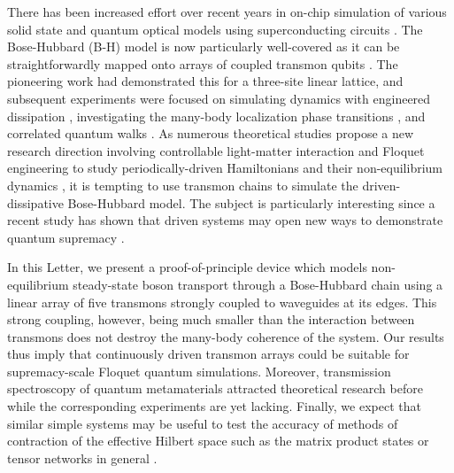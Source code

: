 \documentclass[%
 aps, prl,
 amsmath,amssymb,
 reprint,%
superscriptaddress
]{revtex4-2}
\begin{document}
\maketitle



There has been increased effort over recent years in on-chip simulation of various solid state and quantum optical models using superconducting circuits \cite{kjaergaard2019superconducting}. The Bose-Hubbard (B-H) model is now particularly well-covered as it can be straightforwardly mapped onto arrays of coupled transmon qubits \cite{orell2019probing,yanay2020two}. The pioneering work \cite{hacohen2015cooling} had demonstrated this for a three-site linear lattice, and subsequent experiments were focused on simulating dynamics with engineered dissipation \cite{ma2019dissipatively}, investigating the many-body localization phase transitions \cite{roushan2017spectroscopic,chiaro2019growth}, and correlated quantum walks \cite{Yan2019, Ye2019}. As numerous theoretical studies propose a new research direction involving controllable light-matter interaction and Floquet engineering to study periodically-driven Hamiltonians and their non-equilibrium dynamics \cite{Goldman2014, eisert2015quantum, Zippilli2015, kyriienko2018floquet, franca2020simulating}, it is tempting to use transmon chains  to simulate the driven-dissipative Bose-Hubbard model. The subject is particularly interesting since a recent study has shown that driven systems may open new ways to demonstrate quantum supremacy \cite{tangpanitanon2019quantum}.

In this Letter, we present a proof-of-principle device which models non-equilibrium steady-state boson transport through a Bose-Hubbard chain using a linear array of five transmons strongly coupled to waveguides at its edges. This strong coupling, however, being much smaller than the interaction between transmons does not destroy the many-body coherence of the system. Our results thus imply that continuously driven transmon arrays could be suitable for supremacy-scale Floquet quantum simulations. Moreover, transmission spectroscopy of quantum metamaterials attracted theoretical research before \cite{Zagoskin2016, viehmann2013observing, Greenberg2015, Fistul2019, Biella2015,roberts2020driven, collodo2019observation} while the corresponding experiments are yet lacking. Finally, we expect that similar simple systems may be useful to test the accuracy of methods of contraction of the effective Hilbert space such as the matrix product states or tensor networks in general \cite{Biella2015, orell2019probing, di2019efficient}.
\end{document}
